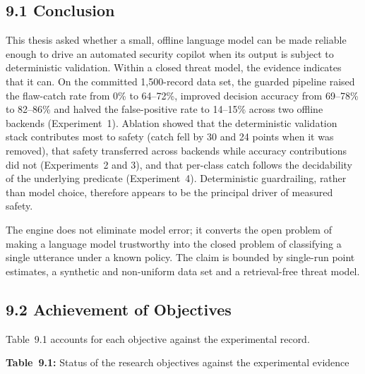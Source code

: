 \documentclass[
]{article}
\begin{document}
\hypertarget{conclusion}{%
\subsection{9.1 Conclusion}\label{conclusion}}

This thesis asked whether a small, offline language model can be made
reliable enough to drive an automated security copilot when its output
is subject to deterministic validation. Within a closed threat model,
the evidence indicates that it can. On the committed 1,500-record data
set, the guarded pipeline raised the flaw-catch rate from 0\% to
64--72\%, improved decision accuracy from 69--78\% to 82--86\% and
halved the false-positive rate to 14--15\% across two offline backends
(Experiment~1). Ablation showed that the deterministic validation stack
contributes most to safety (catch fell by 30 and 24 points when it was
removed), that safety transferred across backends while accuracy
contributions did not (Experiments~2 and 3), and that per-class catch
follows the decidability of the underlying predicate (Experiment~4).
Deterministic guardrailing, rather than model choice, therefore appears
to be the principal driver of measured safety.

The engine does not eliminate model error; it converts the open problem
of making a language model trustworthy into the closed problem of
classifying a single utterance under a known policy. The claim is
bounded by single-run point estimates, a synthetic and non-uniform data
set and a retrieval-free threat model.

\hypertarget{achievement-of-objectives}{%
\subsection{9.2 Achievement of
Objectives}\label{achievement-of-objectives}}

Table~9.1 accounts for each objective against the experimental record.

\protect\hypertarget{_Toc900162}{}{}\textbf{Table~9.1:} Status of the
research objectives against the experimental evidence
\end{document}
